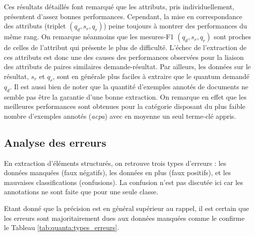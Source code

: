 Ces résultats détaillés font remarqué que les attributs, pris individuellement, présentent d'assez bonnes performances. Cependant, la mise en correspondance des attributs (triplet $(q_d,s_r, q_r)$) peine toujours à montrer des performances du même rang. On remarque néanmoins que les mesures-F1 $(q_d,s_r, q_r)$ sont proches de celles de l'attribut qui présente le plus de difficulté. L'échec de l'extraction de ces attributs est donc une des causes des performances observées pour la liaison des attributs de paires similaires demande-résultat. Par ailleurs, les données sur le résultat, $s_r$ et $q_r$, sont en générale plus faciles à extraire que le quantum demandé $q_d$. Il est aussi bien de noter que la quantité d'exemples annotés de documents ne semble pas être la garantie d'une bonne extraction. On remarque en effet que les meilleures performances sont obtenues pour la catégorie disposant du plus faible nombre d'exemples annotés (\textit{acpa}) avec en moyenne un seul terme-clé appris. %

\subsection{Analyse des erreurs}

En extraction d'éléments structurés, on retrouve trois types d'erreurs \citep{yang2016jointEntityEvt}: les données manquées (faux négatifs), les données en plus (faux positifs), et les mauvaises classifications (confusions). La confusion n'est pas discutée ici car les annotations ne sont faite que pour une seule classe. %

Etant donné que la précision est en général supérieur au rappel, il est certain que les erreurs sont majoritairement dues aux données manquées comme le confirme le Tableau \ref{tab:quanta:types_erreurs}. 

